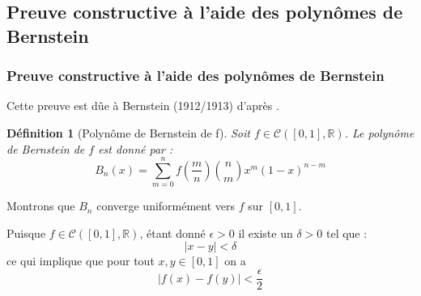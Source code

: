 \documentclass[
	10pt, %
]{beamer}
\newtheorem{defi}[subsubsection]{Définition}
\begin{document}
\begin{frame}
	\section{Preuve constructive à l'aide des polynômes de Bernstein}
	\frametitle{Preuve constructive à l'aide des polynômes de Bernstein}

	Cette preuve est dûe à Bernstein (1912/1913) d'après \cite{pinkus2000approximation}.
	\begin{defi}[Polynôme de Bernstein de f]
		Soit \( f \in \mathcal{C}([0,1],\mathbb{R}) \). Le polynôme de Bernstein de \( f \) est donné par :
	\begin{equation*}
		B_n(x) = \sum_{m=0}^{n} f(\frac{m}{n}) \binom{n}{m} x^{m}(1-x)^{n-m}
	\end{equation*}
	\end{defi}
Montrons que \( B_n \) converge uniformément vers \( f \) sur \( [0,1] \).


	Puisque \( f \in \mathcal{C}([0,1],\mathbb{R}) \), étant donné \( \epsilon > 0 \) il existe un \( \delta > 0 \) tel que :
	\begin{equation*}
		{\left\lvert x - y\right\rvert} < \delta
	\end{equation*}
	ce qui implique que pour tout \( x, y \in [0,1] \) on a 
	\begin{equation*}
		{\left\lvert f(x) - f(y) \right\rvert} < \frac{\epsilon}{2}
	\end{equation*}

\end{frame}
\end{document}
